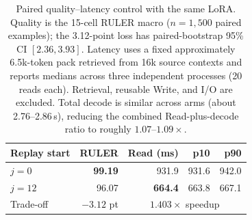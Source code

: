 \begin{table}[!htbp]
\centering
\small
\setlength{\tabcolsep}{4pt}
\begin{tabular}{@{}lrrrr@{}}
\toprule
\textbf{Replay start} & \textbf{RULER} & \textbf{Read (ms)} & \textbf{p10} & \textbf{p90} \\
\midrule
$j{=}0$  & \textbf{99.19} & 931.9 & 931.6 & 942.0 \\
$j{=}12$ & 96.07 & \textbf{664.4} & 663.8 & 667.1 \\
\midrule
Trade-off & $-3.12$ pt & \multicolumn{3}{c}{$1.403\times$ speedup} \\
\bottomrule
\end{tabular}
\caption{Paired quality--latency control with the same LoRA. Quality is the
15-cell RULER macro ($n{=}1{,}500$ paired examples); the 3.12-point loss has
paired-bootstrap 95\% CI $[2.36,3.93]$. Latency uses a fixed approximately
6.5k-token pack retrieved from 16k source contexts and reports
medians across three independent processes (20 reads each). Retrieval, reusable
Write, and I/O are excluded. Total decode is similar across arms (about
2.76--2.86\,s), reducing the combined Read-plus-decode ratio to roughly
$1.07$--$1.09\times$.}
\label{tab:replay-latency}
\end{table}
